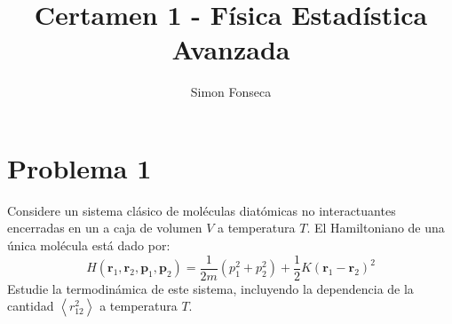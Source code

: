 \documentclass[]{article}
\title{Certamen 1 - Física Estadística Avanzada}
\author{Simon Fonseca}
\numberwithin{equation}{section}
\newcommand{\0}{\textcolor{gray}{0}}
\newcommand{\rv}{\mathbf{r}}
\newcommand{\pv}{\mathbf{p}}
\newcommand{\pr}[1]{\left\langle #1 \right\rangle }
\begin{document}
\maketitle

\section{Problema 1}
Considere un sistema clásico de moléculas diatómicas no interactuantes encerradas en un a caja de volumen $V$ a temperatura $T $. El Hamiltoniano de una única molécula está dado por:
\begin{equation}
	H(\rv_1,\rv_2,\pv_1,\pv_2) = \frac{1}{2m}\left(p_1^2 + p_2^2\right) + \frac{1}{2} K \left(\rv_1 - \rv_2\right)^2
\end{equation}
Estudie la termodinámica de este sistema, incluyendo la dependencia de la cantidad $\pr{r_{12}^2}$ a temperatura $T $.
\\
\end{document}
